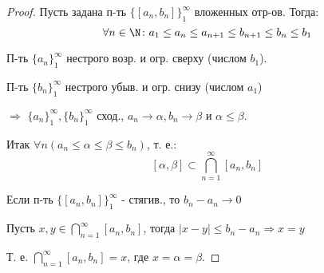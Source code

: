 \begin{proof}
Пусть задана п-ть $\{[a_n, b_n]\}_{1}^{\infty}$ вложенных отр-ов. Тогда:
\[
\forall n \in \N \colon  a_1 \leq a_n \leq a_{n + 1} \leq b_{n + 1} \leq b_n \leq b_1
\] 

П-ть $\{a_n\}_{1}^{\infty}$ нестрого возр. и огр. сверху (числом $b_1$).

П-ть $\{b_n\}_{1}^{\infty}$ нестрого убыв. и огр. снизу (числом $a_1$)

$\Rightarrow$ $\{a_n\}_{1}^{\infty}, \{b_n\}_{1}^{\infty}$ сход., $a_n \rightarrow \alpha, b_n \rightarrow \beta$ и $\alpha \leq \beta$.

Итак $\forall n (a_n \leq \alpha \leq \beta \leq b_n)$, т. е.:
\[
[\alpha, \beta] \subset \bigcap_{n = 1}^{\infty} [a_n, b_n]
\] 

Если п-ть $\{[a_n, b_n]\}_{1}^{\infty}$ - стягив., то $b_n - a_n \rightarrow 0$

Пусть $x, y \in \bigcap_{n = 1}^{\infty} [a_n, b_n]$, тогда $|x - y| \leq b_n - a_n \Rightarrow x = y$

Т. е. $\bigcap_{n = 1}^{\infty} [a_n, b_n] = x$, где $x = \alpha = \beta$. 
\end{proof}

